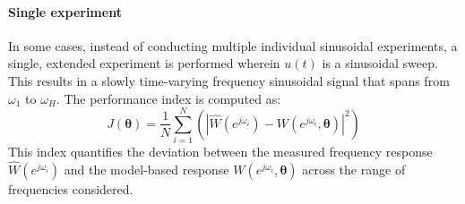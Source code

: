 \paragraph*{Single experiment}
In some cases, instead of conducting multiple individual sinusoidal experiments, a single, extended experiment is performed wherein $u(t)$ is a sinusoidal sweep. 
This results in a slowly time-varying frequency sinusoidal signal that spans from $\omega_1$ to $\omega_H$.
The performance index is computed as:
\[J(\boldsymbol{\theta})=\dfrac{1}{N}\sum_{i=1}^{N}\left(\left\lvert \hat{W}(e^{j\omega_i})-W(e^{j\omega_i},\boldsymbol{\theta})\right\rvert^2\right)\]
This index quantifies the deviation between the measured frequency response $\hat{W}(e^{j\omega_i})$ and the model-based response $W(e^{j\omega_i},\boldsymbol{\theta})$ across the range of frequencies considered.